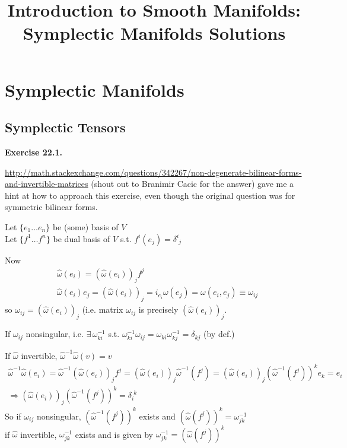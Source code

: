 \documentclass[11pt]{amsart}
\title{Introduction to Smooth Manifolds: Symplectic Manifolds Solutions}
\theoremstyle{definition}
\newcommand{\exercisehead}[1]{\medskip\noindent\textbf{Exercise #1.} }
\begin{document}
\maketitle
\section{Symplectic Manifolds}


\subsection{Symplectic Tensors}

\exercisehead{22.1}

{\scriptsize{\url{http://math.stackexchange.com/questions/342267/non-degenerate-bilinear-forms-and-invertible-matrices}}} (shout out to Branimir Cacic for the answer)  gave me a hint at how to approach this exercise, even though the original question was for symmetric bilinear forms.

Let $\lbrace e_1 \dots e_n \rbrace$ be (some) basis of $V$ \\
Let $\lbrace f^1 \dots f^n \rbrace$ be dual basis of $V$ s.t. $f^i(e_j)=\delta^i_{ \,\, j}$

Now
\[
\begin{aligned}
  & \widehat{\omega}(e_i) = (\widehat{\omega}(e_i))_jf^j \\
  & \widehat{\omega}(e_i)e_j = (\widehat{\omega}(e_i))_j = i_{e_i}\omega(e_j) = \omega(e_i,e_j) \equiv \omega_{ij}
\end{aligned}
\]
so $\omega_{ij} = (\widehat{\omega}(e_i))_j$ (i.e. matrix $\omega_{ij}$ is precisely $(\widehat{\omega}(e_i))_j$.

If $\omega_{ij}$ nonsingular, i.e. $\exists \, \omega^{-1}_{ki}$ s.t. $\omega^{-1}_{ki} \omega_{ij} = \omega_{ki}\omega^{-1}_{kj} = \delta_{kj}$ (by def.)

If $\widehat{\omega}$ invertible, $\widehat{\omega}^{-1} \widehat{\omega}(v) = v$
\[
\begin{gathered}
  \widehat{\omega}^{-1}\widehat{\omega}(e_i) = \widehat{\omega}^{-1}(\widehat{\omega}(e_i))_j f^j = (\widehat{\omega}(e_i))_j \widehat{\omega}^{-1}(f^j) = (\widehat{\omega}(e_i))_j(\widehat{\omega}^{-1}(f^j))^k e_k = e_i \\
\Longrightarrow (\widehat{\omega}(e_i))_j(\widehat{\omega}^{-1}(f^j))^k = \delta_i^{ \, \, k}
\end{gathered}
\]
So if $\omega_{ij}$ nonsingular, $(\widehat{\omega}^{-1}(f^j))^k$ exists and $(\widehat{\omega}(f^j))^k = \omega^{-1}_{jk}$ \\
\phantom{So } if $\widehat{\omega}$ invertible, $\omega^{-1}_{jk}$ exists and is given by $\omega^{-1}_{jk} = (\widehat{\omega}(f^j))^k$
\end{document}
